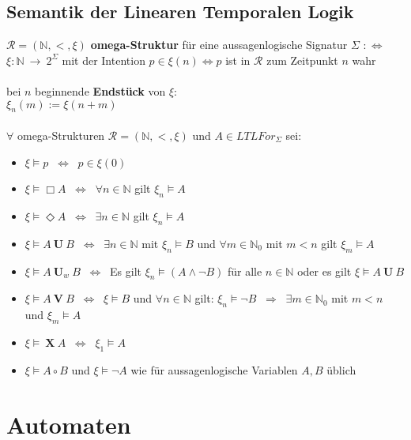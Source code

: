 \documentclass[a4paper,11pt]{scrartcl}
\newcommand{\calR}{\mathcal{R}}
\newcommand{\tbf}{\textbf}
\newcommand{\Lra}{\Leftrightarrow}
\newcommand{\LTLF}{LTLFor_\Sigma}
\newcommand{\until}{\ \mathbf{U} \ }
\newcommand{\neXt}{\ \mathbf{X} \ }
\newcommand{\nat}{\mathbb{N}}
\newcommand{\omegaS}{\calR = (\nat, <, \xi)}
\newcommand{\gilt}{\vDash}
\theoremstyle{default}
\begin{document}
\subsection{Semantik der Linearen Temporalen Logik}
$\omegaS$ \tbf{omega-Struktur} für eine aussagenlogische Signatur $\Sigma$ $:\Lra$ \\
$\xi: \nat \ \rightarrow \ 2^\Sigma$ mit der Intention $p \in \xi(n) \Lra p$ ist in $\calR$ zum Zeitpunkt $n$ wahr \\
\ \\ bei $n$ beginnende \tbf{Endstück} von $\xi$: \\
$\xi_n(m) := \xi(n + m)$ \\
\ \\ $\forall$ omega-Strukturen $\omegaS$ und $A \in \LTLF$ sei: 
\begin{itemize}
 \item $\xi \gilt p$ $\ \Lra \ $ $p \in \xi(0)$
 \item $\xi \gilt \Box A$ $\ \Lra \ $ $\forall n \in \nat$ gilt $\xi_n \gilt A$
 \item $\xi \gilt \Diamond A$ $\ \Lra \ $ $\exists n \in \nat$ gilt $\xi_n \gilt A$
 \item $\xi \gilt A \until B$ $\ \Lra \ $ $\exists n \in \nat$ mit $\xi_n \gilt B$ und $\forall m \in \nat_0$ mit $m < n$ gilt $\xi_m \gilt A$
 \item $\xi \gilt A \ \mathbf{U}_w \ B$ $\ \Lra \ $ Es gilt $\xi_n \gilt (A \land \neg B)$ für alle $n \in \nat$ oder es gilt $\xi \gilt A \until B$
 \item $\xi \gilt A \ \mathbf{V} \ B$ $\ \Lra \ $ $\xi \gilt B$ und $\forall n \in \nat$ gilt: $\xi_n \gilt \neg B$ $\ \Rightarrow \ $ $\exists m \in \nat_0$ mit $m < n$ und $\xi_m \gilt A$
 \item $\xi \gilt \neXt A$ $\ \Lra \ $ $\xi_1 \gilt A$
 \item $\xi \gilt A \circ B$ und $\xi \gilt \neg A$ wie für aussagenlogische Variablen $A,B$ üblich
\end{itemize}


\newpage
\section{Automaten}
\end{document}
